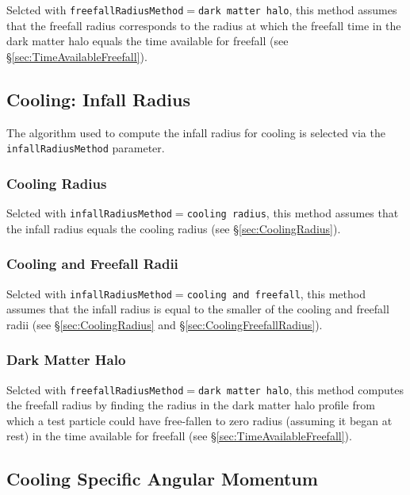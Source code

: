 Selcted with {\tt freefallRadiusMethod}$=${\tt dark matter halo}, this method assumes that the freefall radius corresponds to the radius at which the freefall time in the dark matter halo equals the time available for freefall (see \S\ref{sec:TimeAvailableFreefall}).

\subsection{Cooling: Infall Radius}\label{sec:CoolingInfallRadius}

The algorithm used to compute the infall radius for cooling is selected via the {\tt infallRadiusMethod} parameter.

\subsubsection{Cooling Radius}

Selcted with {\tt infallRadiusMethod}$=${\tt cooling radius}, this method assumes that the infall radius equals the cooling radius (see \S\ref{sec:CoolingRadius}).

\subsubsection{Cooling and Freefall Radii}

Selcted with {\tt infallRadiusMethod}$=${\tt cooling and freefall}, this method assumes that the infall radius is equal to the smaller of the cooling and freefall radii (see \S\ref{sec:CoolingRadius} and \S\ref{sec:CoolingFreefallRadius}).

\subsubsection{Dark Matter Halo}

Selcted with {\tt freefallRadiusMethod}$=${\tt dark matter halo}, this method computes the freefall radius by finding the radius in the dark matter halo profile from which a test particle could have free-fallen to zero radius (assuming it began at rest) in the time available for freefall (see \S\ref{sec:TimeAvailableFreefall}).

\subsection{Cooling Specific Angular Momentum}

